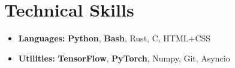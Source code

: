 \section*{Technical Skills}
\begin{itemize}[itemsep=0mm]

    \item \textbf{Languages:} \textbf{Python}, \textbf{Bash}, Rust, C, HTML+CSS
    \item \textbf{Utilities:} \textbf{TensorFlow}, \textbf{PyTorch}, Numpy, Git, Asyncio

\end{itemize}
